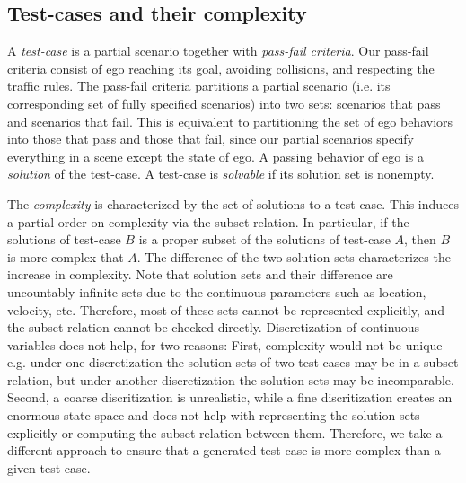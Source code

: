 \subsection{Test-cases and their complexity}

A \emph{test-case} is a partial scenario together with \emph{pass-fail criteria}.
%
Our pass-fail criteria consist of ego reaching its goal, avoiding collisions, and respecting the traffic rules.
%
The pass-fail criteria partitions a partial scenario (i.e. its corresponding set of fully specified scenarios) into two sets: scenarios that pass and scenarios that fail.
%
This is equivalent to partitioning the set of ego behaviors into those that pass and those that fail, since our partial scenarios specify everything in a scene except the state of ego.
%
A passing behavior of ego is a \emph{solution} of the test-case.
%
A test-case is \emph{solvable} if its solution set is nonempty.


The \emph{complexity} is characterized by the set of solutions to a test-case.
%
This induces a partial order on complexity via the subset relation.
%
In particular, if the solutions of test-case $B$ is a proper subset of the solutions of  test-case $A$, then $B$ is more complex that $A$.
%
The difference of the two solution sets characterizes the increase in complexity.
%
Note that solution sets and their difference are uncountably infinite sets due to the continuous parameters such as location, velocity, etc.
%
Therefore, most of these sets cannot be represented explicitly, and the subset relation cannot be checked directly.
%
Discretization of continuous variables does not help, for two reasons:
%
First, complexity would not be unique e.g. under one discretization the solution sets of two test-cases may be in a subset relation, but under another discretization the solution sets may be incomparable.
%
Second, a coarse discritization is unrealistic, while a fine discritization creates an enormous state space and does not help with representing the solution sets explicitly or computing the subset relation between them.
%
Therefore, we take a different approach to ensure that a generated test-case is more complex than a given test-case.


